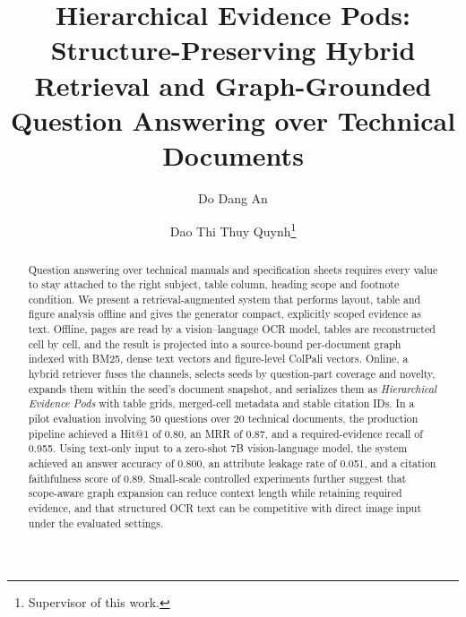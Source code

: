 \documentclass[runningheads]{llncs}
\newif\ifanon
\begin{document}
\title{Hierarchical Evidence Pods: Structure-Preserving Hybrid Retrieval and Graph-Grounded Question Answering over Technical Documents}

\ifanon
\author{Anonymous Author(s)}
\authorrunning{Anonymous}
\institute{Anonymous Institution}
\else
\author{Do Dang An \and Dao Thi Thuy Quynh\thanks{Supervisor of this work.}}
\fi

\maketitle

\begin{abstract}
Question answering over technical manuals and specification sheets requires every value to stay attached to the right subject, table column, heading scope and footnote condition. We present a retrieval-augmented system that performs layout, table and figure analysis offline and gives the generator compact, explicitly scoped evidence as text. Offline, pages are read by a vision--language OCR model, tables are reconstructed cell by cell, and the result is projected into a source-bound per-document graph indexed with BM25, dense text vectors and figure-level ColPali vectors. Online, a hybrid retriever fuses the channels, selects seeds by question-part coverage and novelty, expands them within the seed's document snapshot, and serializes them as \emph{Hierarchical Evidence Pods} with table grids, merged-cell metadata and stable citation IDs. In a pilot evaluation involving 50 questions over 20 technical documents, the production pipeline achieved a Hit@1 of 0.80, an MRR of 0.87, and a required-evidence recall of 0.955. Using text-only input to a zero-shot 7B vision-language model, the system achieved an answer accuracy of 0.800, an attribute leakage rate of 0.051, and a citation faithfulness score of 0.89. Small-scale controlled experiments further suggest that scope-aware graph expansion can reduce context length while retaining required evidence, and that structured OCR text can be competitive with direct image input under the evaluated settings.
\end{abstract}
\end{document}
